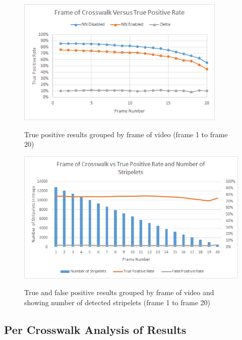\documentclass[12pt]{ucthesis}
\newcommand{\captionfonts}{\small\bf\ssp}
\begin{document}
\begin{figure}[t]
\begin{center}
\includegraphics[width=10cm]{FrameResultsGraph.png}
\captionfonts
\caption[Neural Network True Positives Grouped by Frame of Video]{True positive results grouped by frame of video (frame 1 to frame 20)}
\label{fig:graphOfFrameCount}
\end{center}
\end{figure}

\begin{figure}[t]
\begin{center}
\includegraphics[width=12cm]{NumStripeletsvsRates.png}
\captionfonts
\caption[True and False Positives Grouped by Frame of Video and Number of Stripelets]{True and false positive results grouped by frame of video and showing number of detected stripelets (frame 1 to frame 20)}
\label{fig:NumStripeletsvsRates}
\end{center}
\end{figure}

\clearpage

\subsection{Per Crosswalk Analysis of Results}
\end{document}
